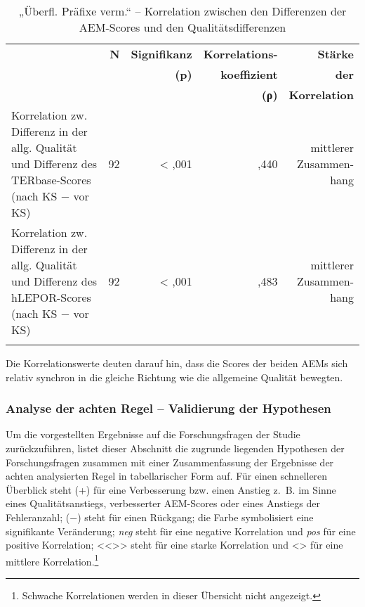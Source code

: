 \begin{table}
\begin{tabularx}{\textwidth}{Xrrrr}

\lsptoprule
& \textbf{N} & { \textbf{Signifikanz} } & \textbf{Korrelations-} & \textbf{Stärke}\\
& & \textbf{(p)} & \textbf{koeffizient} & \textbf{der}\\
& & &  \textbf{(ρ)} &  \textbf{Korrelation}\\
\midrule
Korrelation zw. Differenz in der allg. Qualität und Differenz des TERbase-Scores (nach KS $-$ vor KS) & { 92} & < ,001 & ,440 & \makecell[tr]{mittlerer\\Zusammen-\\hang}\\
\tablevspace
Korrelation zw. Differenz in der allg. Qualität und Differenz des hLEPOR-Scores (nach KS $-$ vor KS) & 92 & < ,001 & ,483 & \makecell[tr]{mittlerer\\Zusammen-\\hang}\\
\lspbottomrule
\end{tabularx}
\caption{\label{tab:05:79}„Überfl. Präfixe verm.“ -- Korrelation zwischen den Differenzen der AEM-Scores und den Qualitätsdifferenzen   }
\end{table}

Die Korrelationswerte deuten darauf hin, dass die Scores der beiden AEMs sich relativ synchron in die gleiche Richtung wie die allgemeine Qualität bewegten.

\subsubsection{\label{sec:5.3.8.7}Analyse der achten Regel -- Validierung der Hypothesen}

Um die vorgestellten Ergebnisse auf die Forschungsfragen der Studie zurückzuführen, listet dieser Abschnitt die zugrunde liegenden Hypothesen der Forschungsfragen zusammen mit einer Zusammenfassung der Ergebnisse der achten analysierten Regel in tabellarischer Form auf. Für einen schnelleren Überblick steht (+) für eine Verbesserung bzw. einen Anstieg z.~B. im Sinne eines Qualitätsanstiegs, verbesserter AEM-Scores oder eines Anstiegs der Fehleranzahl; ($-$) steht für einen Rückgang; die  Farbe symbolisiert eine signifikante Veränderung; \textit{neg} steht für eine negative Korrelation und \textit{pos} für eine positive Korrelation; <{}<{}>{}> steht für eine starke Korrelation und <> für eine mittlere Korrelation.\footnote{\textrm{Schwache Korrelationen werden in dieser Übersicht nicht angezeigt.}}

